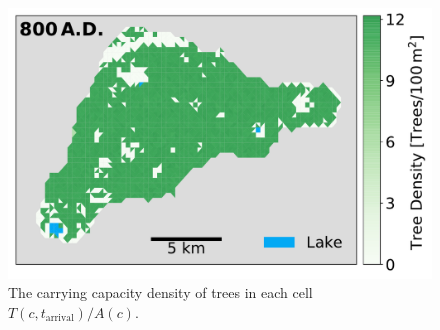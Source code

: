 \begin{figure}
	\centering
	\includegraphics[width=\textwidth]{images/map_carrCap.pdf}
	\caption{The carrying capacity density of trees in each cell $T(c,t_\text{arrival})/A(c)$.}
	\label{fig:Map_tree}
\end{figure}

